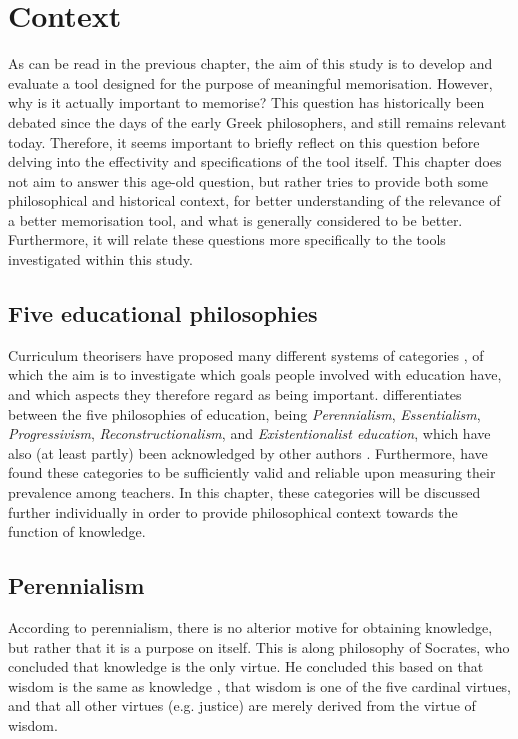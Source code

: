 \chapter{Context}

As can be read in the previous chapter, the aim of this study is to develop and evaluate a tool designed for the purpose of meaningful memorisation. However, why is it actually important to memorise? This question has historically been debated since the days of the early Greek philosophers, and still remains relevant today. Therefore, it seems important to briefly reflect on this question before delving into the effectivity and specifications of the tool itself. This chapter does not aim to answer this age-old question, but rather tries to provide both some philosophical and historical context, for better understanding of the relevance of a better memorisation tool, and what is generally considered to be better. Furthermore, it will relate these questions more specifically to the tools investigated within this study.

\section{Five educational philosophies}

Curriculum theorisers have proposed many different systems of categories \cite{curriculumtheory}, of which the aim is to investigate which goals people involved with education have, and which aspects they therefore regard as being important.  differentiates between the five philosophies of education, being \emph{Perennialism}, \emph{Essentialism}, \emph{Progressivism}, \emph{Reconstructionalism}, and \emph{Existentionalist education}, which have also (at least partly) been acknowledged by other authors \cite{educationalphilosophy, educationalphilosophy2, educationalphilosophy3, educationalphilosophy4}. Furthermore,  have found these categories to be sufficiently valid and reliable upon measuring their prevalence among teachers. In this chapter, these categories will be discussed further individually in order to provide philosophical context towards the function of knowledge.

\section{Perennialism}

According to perennialism, there is no alterior motive for obtaining knowledge, but rather that it is a purpose on itself. This is along philosophy of Socrates, who concluded that knowledge is the only virtue. He concluded this based on that wisdom is the same as knowledge \cite{wisdomknowledge}, that wisdom is one of the five cardinal virtues, and that all other virtues (e.g. justice) are merely derived from the virtue of wisdom.

